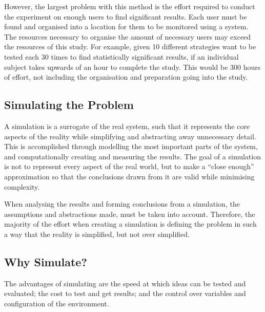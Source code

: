 However, the largest problem with this method is the effort required to conduct the experiment on enough users to find significant results.
Each user must be found and organised into a location for them to be monitored using a system.
The resources necessary to organise the amount of necessary users may exceed the resources of this study.
For example, given 10 different strategies want to be tested each 30 times to find statistically significant results, 
if an individual subject takes upwards of an hour to complete the study.
This would be 300 hours of effort, not including the organisation and preparation going into the study.

\subsection{Simulating the Problem}
A simulation is a surrogate of the real system, 
such that it represents the core aspects of the reality while simplifying and abstracting away unnecessary detail.
This is accomplished through modelling the most important parts of the system, 
and computationally creating and measuring the results. 
The goal of a simulation is not to represent every aspect of the real world, 
but to make a ``close enough'' approximation so that the conclusions drawn from it are valid while minimising complexity.

When analysing the results and forming conclusions from a simulation, 
the assumptions and abstractions made, must be taken into account. %
Therefore, the majority of the effort when creating a simulation is defining the problem in such a way that the reality is simplified, but not over simplified.

\subsection{Why Simulate?}
The advantages of simulating are the speed at which ideas can be tested and evaluated;
the cost to test and get results; and the control over variables and configuration of the environment.

